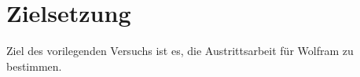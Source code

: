 \section{Zielsetzung}
\label{sec:Zielsetzung}

Ziel des vorilegenden Versuchs ist es, die Austrittsarbeit für Wolfram zu bestimmen.
